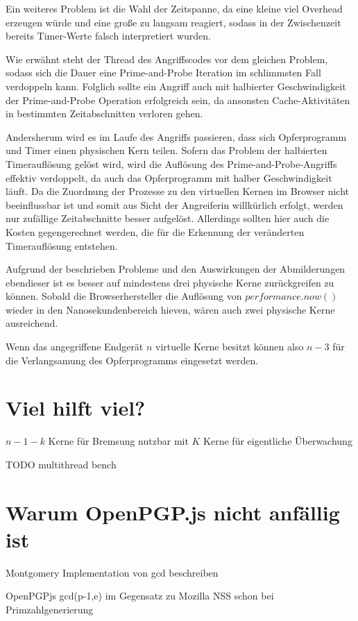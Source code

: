 Ein weiteres Problem ist die Wahl der Zeitspanne, da eine kleine viel Overhead erzeugen würde und eine große zu langsam reagiert, sodass in der Zwischenzeit bereits Timer-Werte falsch interpretiert wurden.

Wie erwähnt steht der Thread des Angriffscodes vor dem gleichen Problem, sodass sich die Dauer eine Prime-and-Probe Iteration im schlimmsten Fall verdoppeln kann.
Folglich sollte ein Angriff auch mit halbierter Geschwindigkeit der Prime-and-Probe Operation erfolgreich sein, da ansonsten Cache-Aktivitäten in bestimmten Zeitabschnitten verloren gehen.

Andersherum wird es im Laufe des Angriffs passieren, dass sich Opferprogramm und Timer einen physischen Kern teilen.
Sofern das Problem der halbierten Timerauflösung gelöst wird, wird die Auflösung des Prime-and-Probe-Angriffs effektiv verdoppelt, da auch das Opferprogramm mit halber Geschwindigkeit läuft.
Da die Zuordnung der Prozesse zu den virtuellen Kernen im Browser nicht beeinflussbar ist und somit aus Sicht der Angreiferin willkürlich erfolgt, werden nur zufällige Zeitabschnitte besser aufgelöst.
Allerdings sollten hier auch die Kosten gegengerechnet werden, die für die Erkennung der veränderten Timerauflösung entstehen.

Aufgrund der beschrieben Probleme und den Auswirkungen der Abmilderungen ebendieser ist es besser auf mindestens drei physische Kerne zurückgreifen zu können.
Sobald die Browserhersteller die Auflösung von $performance.now()$ wieder in den Nanosekundenbereich hieven, wären auch zwei physische Kerne ausreichend. 

Wenn das angegriffene Endgerät $n$ virtuelle Kerne besitzt können also $n-3$ für die Verlangsamung des Opferprogramms eingesetzt werden.

\section{Viel hilft viel?}

$n-1-k$ Kerne für Bremsung nutzbar mit $K$ Kerne für eigentliche Überwachung 

TODO multithread bench

\section{Warum OpenPGP.js nicht anfällig ist}

Montgomery Implementation von gcd beschreiben

OpenPGPjs gcd(p-1,e) im Gegensatz zu Mozilla NSS schon bei Primzahlgenerierung

